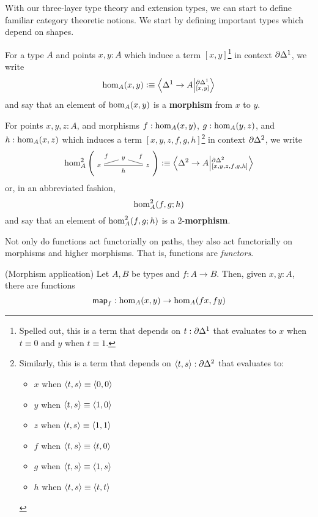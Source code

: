 \documentclass[main.tex]{subfiles}
\begin{document}
With our three-layer type theory and extension types, we can start to define familiar category theoretic notions. We start by defining important types which depend on shapes.

\begin{definition}
    For a type $A$ and points $x,y : A$ which induce a term $[x,y]$\footnote{Spelled out, this is a term that depends on $t : \pardo $ that evaluates to $x$ when $t \equiv 0$ and $y$ when $t \equiv 1$.} in context $\pardo$, we write
    $$\ho[A]{x}{y} \defeq \ndexten{\osx}{A}{\pardo}{[x,y]}$$
    and say that an element of $\ho[A]{x}{y}$ is a \textbf{morphism} from $x$ to $y$. 
\end{definition}
\begin{definition}
    For points $x,y,z : A$, and morphisms $f : \ho[A]{x}{y}$, $g : \ho[A]{y}{z}$, and $h : \ho[A]{x}{z}$ which induces a term $[x,y,z,f,g,h]$\footnote{Similarly, this is a term that depends on $\pair{t}{s} :\pardt$ that evaluates to:
    \begin{itemize}
        \item $x$ when $\pair{t}{s} \equiv \pair{0}{0}$ 
        \item $y$ when $\pair{t}{s} \equiv \pair{1}{0}$ 
        \item $z$ when $\pair{t}{s} \equiv \pair{1}{1}$
        \item $f$ when $\pair{t}{s} \equiv \pair{t}{0}$
        \item $g$ when $\pair{t}{s} \equiv \pair{1}{s}$
        \item $h$ when $\pair{t}{s} \equiv \pair{t}{t}$
    \end{itemize} } in context $\pardt$, we write
    $$\homtwo{A}(x,y,z,f,f,h) \defeq \ndexten{\tsx}{A}{\pardt}{[x,y,z,f,g,h]}$$
    or, in an abbreviated fashion,
    $$\homtwoshort{A}(x,y,z,f,g,h)$$
    and say that an element of $\homtwoshort{A}(x,y,z,f,g,h)$ is a $2$-\textbf{morphism}.
\end{definition}


Not only do functions act functorially on paths, they also act functorially on morphisms and higher morphisms. That is, functions
are \textit{functors}.
\begin{lemma}(Morphism application)
    Let $A,B$ be types and $f : A \to B$. Then, given $x,y : A$, there are functions 
    $$\mapfunc{f} : \ho[A]{x}{y} \to \ho[A]{f x}{f y}$$
\end{lemma}
\end{document}
